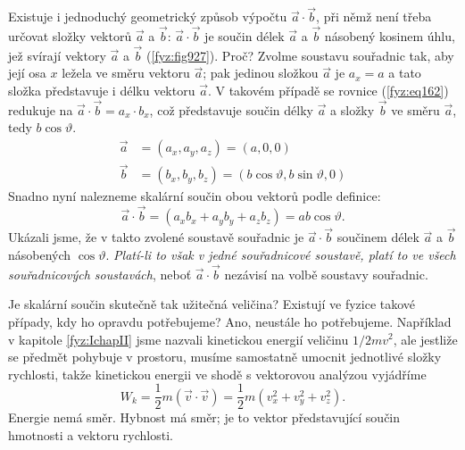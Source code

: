 
    Existuje i jednoduchý geometrický způsob výpočtu \(\vec{a}\cdot\vec{b}\), při němž není třeba
    určovat složky vektorů \(\vec{a}\) a \(\vec{b}\): \(\vec{a}\cdot\vec{b}\) je součin délek
    \(\vec{a}\) a \(\vec{b}\) násobený kosinem úhlu, jež svírají vektory \(\vec{a}\) a \(\vec{b}\)
    (\ref{fyz:fig927}). Proč? Zvolme soustavu souřadnic tak, aby její osa \(x\) ležela ve směru
    vektoru \(\vec{a}\); pak jedinou složkou \(\vec{a}\) je \(a_x=a\) a tato složka představuje i
    délku vektoru \(\vec{a}\). V takovém případě se rovnice (\ref{fyz:eq162}) redukuje na
    \(\vec{a}\cdot\vec{b} = a_x\cdot b_x\), což představuje součin délky \(\vec{a}\) a složky
    \(\vec{b}\) ve směru \(\vec{a}\), tedy \(b\cos\vartheta\).
    \begin{equation}
      \begin{aligned}\label{fyz:eq753}
        \vec{a} &= (a_x, a_y, a_z) = (a, 0, 0)  \\
        \vec{b} &= (b_x, b_y, b_z) = (b\cos\vartheta, b\sin\vartheta, 0)
      \end{aligned}
    \end{equation}
    Snadno nyní nalezneme skalární součin obou vektorů podle definice: 
    \begin{equation*}
      \vec{a}\cdot\vec{b} = (a_xb_x + a_yb_y + a_zb_z) = ab\cos\vartheta.
    \end{equation*}
    Ukázali jsme, že v takto zvolené soustavě souřadnic je \(\vec{a}\cdot\vec{b}\) součinem délek 
    \(\vec{a}\) a \(\vec{b}\) násobených \(\cos\vartheta\). \emph{Platí-li to však v jedné 
    souřadnicové soustavě, platí to ve všech souřadnicových soustavách}, neboť 
    \(\vec{a}\cdot\vec{b}\) nezávisí na volbě soustavy souřadnic.
    
    

    Je skalární součin skutečně tak užitečná veličina? Existují ve fyzice takové případy, kdy ho 
    opravdu potřebujeme? Ano, neustále ho potřebujeme. Například v kapitole \ref{fyz:IchapII} jsme 
    nazvali kinetickou energií veličinu \(1/2 mv^2\), ale jestliže se předmět pohybuje v prostoru, 
    musíme samostatně umocnit jednotlivé složky rychlosti, takže kinetickou energii ve shodě s 
    vektorovou analýzou vyjádříme
    \begin{equation}\label{fyz:eq165}
      W_k = \frac{1}{2}m(\vec{v}\cdot\vec{v}) = \frac{1}{2}m(v_x^2 + v_y^2 + v_z^2).
    \end{equation}
    Energie nemá směr. Hybnost má směr; je to vektor představující součin hmotnosti a vektoru
    rychlosti.
    
